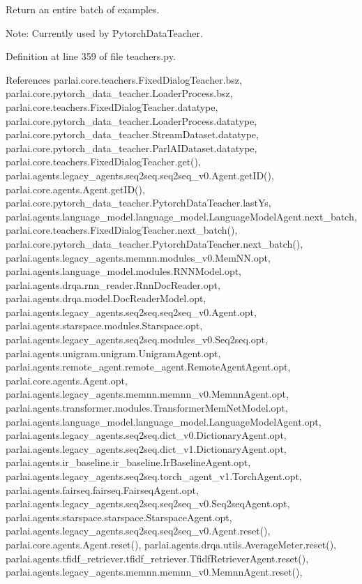 \begin{DoxyVerb}Return an entire batch of examples.

Note: Currently used by PytorchDataTeacher.
\end{DoxyVerb}
 

Definition at line 359 of file teachers.\+py.



References parlai.\+core.\+teachers.\+Fixed\+Dialog\+Teacher.\+bsz, parlai.\+core.\+pytorch\+\_\+data\+\_\+teacher.\+Loader\+Process.\+bsz, parlai.\+core.\+teachers.\+Fixed\+Dialog\+Teacher.\+datatype, parlai.\+core.\+pytorch\+\_\+data\+\_\+teacher.\+Loader\+Process.\+datatype, parlai.\+core.\+pytorch\+\_\+data\+\_\+teacher.\+Stream\+Dataset.\+datatype, parlai.\+core.\+pytorch\+\_\+data\+\_\+teacher.\+Parl\+A\+I\+Dataset.\+datatype, parlai.\+core.\+teachers.\+Fixed\+Dialog\+Teacher.\+get(), parlai.\+agents.\+legacy\+\_\+agents.\+seq2seq.\+seq2seq\+\_\+v0.\+Agent.\+get\+I\+D(), parlai.\+core.\+agents.\+Agent.\+get\+I\+D(), parlai.\+core.\+pytorch\+\_\+data\+\_\+teacher.\+Pytorch\+Data\+Teacher.\+last\+Ys, parlai.\+agents.\+language\+\_\+model.\+language\+\_\+model.\+Language\+Model\+Agent.\+next\+\_\+batch, parlai.\+core.\+teachers.\+Fixed\+Dialog\+Teacher.\+next\+\_\+batch(), parlai.\+core.\+pytorch\+\_\+data\+\_\+teacher.\+Pytorch\+Data\+Teacher.\+next\+\_\+batch(), parlai.\+agents.\+legacy\+\_\+agents.\+memnn.\+modules\+\_\+v0.\+Mem\+N\+N.\+opt, parlai.\+agents.\+language\+\_\+model.\+modules.\+R\+N\+N\+Model.\+opt, parlai.\+agents.\+drqa.\+rnn\+\_\+reader.\+Rnn\+Doc\+Reader.\+opt, parlai.\+agents.\+drqa.\+model.\+Doc\+Reader\+Model.\+opt, parlai.\+agents.\+legacy\+\_\+agents.\+seq2seq.\+seq2seq\+\_\+v0.\+Agent.\+opt, parlai.\+agents.\+starspace.\+modules.\+Starspace.\+opt, parlai.\+agents.\+legacy\+\_\+agents.\+seq2seq.\+modules\+\_\+v0.\+Seq2seq.\+opt, parlai.\+agents.\+unigram.\+unigram.\+Unigram\+Agent.\+opt, parlai.\+agents.\+remote\+\_\+agent.\+remote\+\_\+agent.\+Remote\+Agent\+Agent.\+opt, parlai.\+core.\+agents.\+Agent.\+opt, parlai.\+agents.\+legacy\+\_\+agents.\+memnn.\+memnn\+\_\+v0.\+Memnn\+Agent.\+opt, parlai.\+agents.\+transformer.\+modules.\+Transformer\+Mem\+Net\+Model.\+opt, parlai.\+agents.\+language\+\_\+model.\+language\+\_\+model.\+Language\+Model\+Agent.\+opt, parlai.\+agents.\+legacy\+\_\+agents.\+seq2seq.\+dict\+\_\+v0.\+Dictionary\+Agent.\+opt, parlai.\+agents.\+legacy\+\_\+agents.\+seq2seq.\+dict\+\_\+v1.\+Dictionary\+Agent.\+opt, parlai.\+agents.\+ir\+\_\+baseline.\+ir\+\_\+baseline.\+Ir\+Baseline\+Agent.\+opt, parlai.\+agents.\+legacy\+\_\+agents.\+seq2seq.\+torch\+\_\+agent\+\_\+v1.\+Torch\+Agent.\+opt, parlai.\+agents.\+fairseq.\+fairseq.\+Fairseq\+Agent.\+opt, parlai.\+agents.\+legacy\+\_\+agents.\+seq2seq.\+seq2seq\+\_\+v0.\+Seq2seq\+Agent.\+opt, parlai.\+agents.\+starspace.\+starspace.\+Starspace\+Agent.\+opt, parlai.\+agents.\+legacy\+\_\+agents.\+seq2seq.\+seq2seq\+\_\+v0.\+Agent.\+reset(), parlai.\+core.\+agents.\+Agent.\+reset(), parlai.\+agents.\+drqa.\+utils.\+Average\+Meter.\+reset(), parlai.\+agents.\+tfidf\+\_\+retriever.\+tfidf\+\_\+retriever.\+Tfidf\+Retriever\+Agent.\+reset(), parlai.\+agents.\+legacy\+\_\+agents.\+memnn.\+memnn\+\_\+v0.\+Memnn\+Agent.\+reset(), 